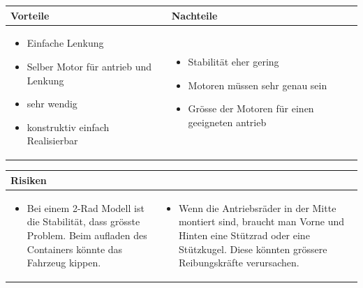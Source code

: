\begin{table}[h]
\begin{tabular}{p{} | p{}}


 \textbf{Vorteile} & \textbf{Nachteile} \\ \hline
	 
\begin{itemize}
\item Einfache Lenkung
\item Selber Motor für antrieb und Lenkung
\item sehr wendig
\item konstruktiv einfach Realisierbar
\end{itemize}

 
 &
 
\begin{itemize}
\item Stabilität eher gering
\item Motoren müssen sehr genau sein
\item Grösse der Motoren für einen geeigneten antrieb 
\end{itemize}

\end{tabular}
\end{table}

\begin{table}[h]
\begin{tabular}{p{}p{}}


 \textbf{Risiken} & \\ \hline
	 
\begin{itemize}
\item Bei einem 2-Rad Modell ist die Stabilität, dass grösste Problem. Beim aufladen des Containers könnte das Fahrzeug kippen.
\end{itemize}
&
\begin{itemize}
\item Wenn die Antriebsräder in der Mitte montiert sind, braucht man Vorne und Hinten eine Stützrad oder eine Stützkugel. Diese könnten grössere Reibungskräfte verursachen.
\end{itemize}

 
\end{tabular}
\end{table}

\pagebreak